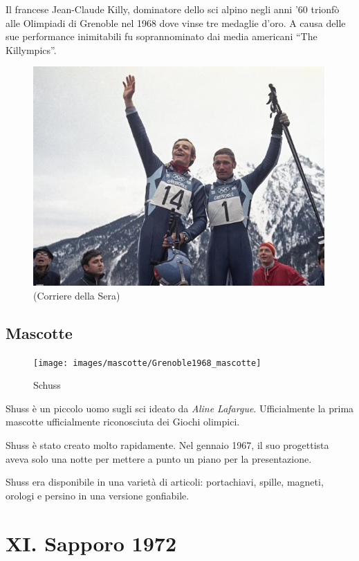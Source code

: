 \documentclass[
]{book}
\begin{document}
Il francese Jean-Claude Killy, dominatore dello sci alpino negli anni '60 trionfò alle Olimpiadi di Grenoble nel 1968 dove vinse tre medaglie d'oro. A causa delle sue performance inimitabili fu soprannominato dai media americani ``The Killympics''.

\begin{figure}
\includegraphics[width=0.8\linewidth]{images/corriere/1968(2)} \caption{(Corriere della Sera)}\label{fig:unnamed-chunk-32}
\end{figure}

\section*{Mascotte}\label{mascotte}

\begin{figure}
\texttt{[image: images/mascotte/Grenoble1968\_mascotte]} \caption{Schuss}\label{fig:unnamed-chunk-33}
\end{figure}

Shuss è un piccolo uomo sugli sci ideato da \emph{Aline Lafargue}. Ufficialmente la prima mascotte ufficialmente riconosciuta dei Giochi olimpici.

Shuss è stato creato molto rapidamente. Nel gennaio 1967, il suo progettista aveva solo una notte per mettere a punto un piano per la presentazione.

Shuss era disponibile in una varietà di articoli: portachiavi, spille, magneti, orologi e persino in una versione gonfiabile.

\chapter*{XI. Sapporo 1972}\label{xi.-sapporo-1972}
\end{document}
